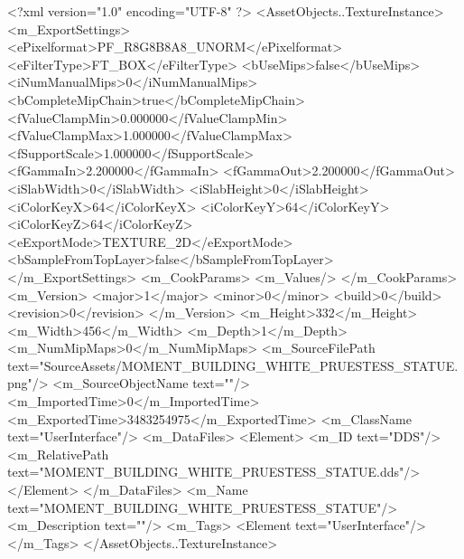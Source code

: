 <?xml version="1.0" encoding="UTF-8" ?>
<AssetObjects..TextureInstance>
	<m_ExportSettings>
		<ePixelformat>PF_R8G8B8A8_UNORM</ePixelformat>
		<eFilterType>FT_BOX</eFilterType>
		<bUseMips>false</bUseMips>
		<iNumManualMips>0</iNumManualMips>
		<bCompleteMipChain>true</bCompleteMipChain>
		<fValueClampMin>0.000000</fValueClampMin>
		<fValueClampMax>1.000000</fValueClampMax>
		<fSupportScale>1.000000</fSupportScale>
		<fGammaIn>2.200000</fGammaIn>
		<fGammaOut>2.200000</fGammaOut>
		<iSlabWidth>0</iSlabWidth>
		<iSlabHeight>0</iSlabHeight>
		<iColorKeyX>64</iColorKeyX>
		<iColorKeyY>64</iColorKeyY>
		<iColorKeyZ>64</iColorKeyZ>
		<eExportMode>TEXTURE_2D</eExportMode>
		<bSampleFromTopLayer>false</bSampleFromTopLayer>
	</m_ExportSettings>
	<m_CookParams>
		<m_Values/>
	</m_CookParams>
	<m_Version>
		<major>1</major>
		<minor>0</minor>
		<build>0</build>
		<revision>0</revision>
	</m_Version>
	<m_Height>332</m_Height>
	<m_Width>456</m_Width>
	<m_Depth>1</m_Depth>
	<m_NumMipMaps>0</m_NumMipMaps>
	<m_SourceFilePath text="SourceAssets/MOMENT_BUILDING_WHITE_PRUESTESS_STATUE.png"/>
	<m_SourceObjectName text=""/>
	<m_ImportedTime>0</m_ImportedTime>
	<m_ExportedTime>3483254975</m_ExportedTime>
	<m_ClassName text="UserInterface"/>
	<m_DataFiles>
		<Element>
			<m_ID text="DDS"/>
			<m_RelativePath text="MOMENT_BUILDING_WHITE_PRUESTESS_STATUE.dds"/>
		</Element>
	</m_DataFiles>
	<m_Name text="MOMENT_BUILDING_WHITE_PRUESTESS_STATUE"/>
	<m_Description text=""/>
	<m_Tags>
		<Element text="UserInterface"/>
	</m_Tags>
</AssetObjects..TextureInstance>

